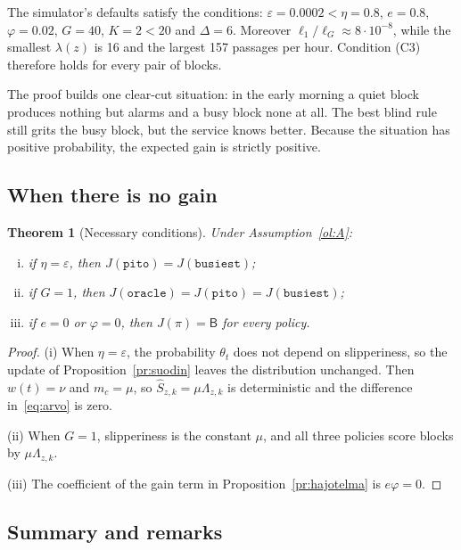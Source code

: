 \documentclass[11pt,a4paper]{article}
\theoremstyle{plain}
\newtheorem{lause}{Theorem}
\theoremstyle{definition}
\theoremstyle{remark}
\newcommand{\1}{\mathbf{1}}
\newcommand{\pol}[1]{\texttt{#1}}
\begin{document}
The simulator's defaults satisfy the conditions: $\varepsilon = 0.0002 < \eta = 0.8$,
$e = 0.8$, $\varphi = 0.02$, $G = 40$, $K = 2 < 20$ and $\Delta = 6$. Moreover
$\ell_1/\ell_G \approx 8 \cdot 10^{-8}$, while the smallest $\lambda(z)$ is 16 and
the largest 157 passages per hour. Condition (C3) therefore holds for every pair
of blocks.

\begin{intuitio}
The proof builds one clear-cut situation: in the early morning a quiet block
produces nothing but alarms and a busy block none at all. The best blind rule
still grits the busy block, but the service knows better. Because the situation
has positive probability, the expected gain is strictly positive.
\end{intuitio}

\subsection{When there is no gain}

\begin{lause}[Necessary conditions]\label{la:valttamaton}
Under Assumption~\ref{ol:A}:
\begin{enumerate}[(i)]
  \item if $\eta = \varepsilon$, then $J(\pol{pito}) = J(\pol{busiest})$;
  \item if $G = 1$, then $J(\pol{oracle}) = J(\pol{pito}) = J(\pol{busiest})$;
  \item if $e = 0$ or $\varphi = 0$, then $J(\pi) = \mathsf{B}$ for every policy.
\end{enumerate}
\end{lause}

\begin{proof}
(i) When $\eta = \varepsilon$, the probability $\theta_t$ does not depend on
slipperiness, so the update of Proposition~\ref{pr:suodin} leaves the
distribution unchanged. Then $w(t) = \nu$ and $m_c = \mu$, so
$\hat S_{z,k} = \mu\Lambda_{z,k}$ is deterministic and the difference
in~\eqref{eq:arvo} is zero.

(ii) When $G = 1$, slipperiness is the constant $\mu$, and all three policies
score blocks by $\mu\Lambda_{z,k}$.

(iii) The coefficient of the gain term in Proposition~\ref{pr:hajotelma} is
$e\varphi = 0$.
\end{proof}

\subsection{Summary and remarks}
\end{document}
